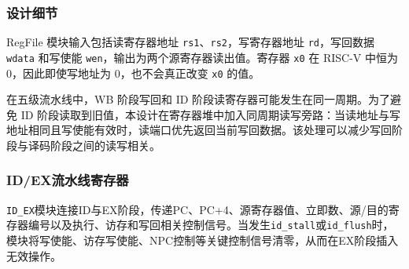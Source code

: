 \documentclass[12pt,a4paper]{ctexart}
\newcommand{\code}[1]{\texttt{#1}}
\begin{document}
\subsubsection*{设计细节}

RegFile 模块输入包括读寄存器地址 \code{rs1}、\code{rs2}，写寄存器地址 \code{rd}，写回数据 \code{wdata} 和写使能 \code{wen}，输出为两个源寄存器读出值。寄存器 \code{x0} 在 RISC-V 中恒为 0，因此即使写地址为 0，也不会真正改变 \code{x0} 的值。

在五级流水线中，WB 阶段写回和 ID 阶段读寄存器可能发生在同一周期。为了避免 ID 阶段读取到旧值，本设计在寄存器堆中加入同周期读写旁路：当读地址与写地址相同且写使能有效时，读端口优先返回当前写回数据。该处理可以减少写回阶段与译码阶段之间的读写相关。

\subsubsection{ID/EX流水线寄存器}

\code{ID\_EX}模块连接ID与EX阶段，传递PC、PC+4、源寄存器值、立即数、源/目的寄存器编号以及执行、访存和写回相关控制信号。当发生\code{id\_stall}或\code{id\_flush}时，模块将写使能、访存写使能、NPC控制等关键控制信号清零，从而在EX阶段插入无效操作。
\end{document}
